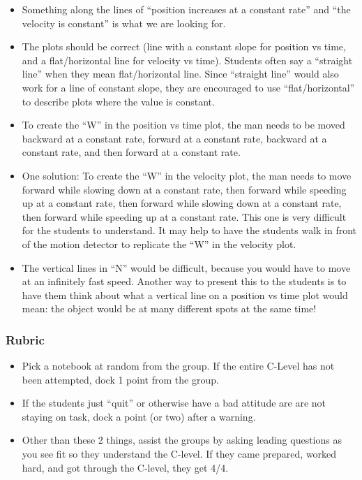 \documentclass[fleqn,letterpaper]{article}
\begin{document}
\begin{itemize}
 \item{Something along the lines of ``position increases at a constant rate'' and ``the velocity is constant'' is what we are looking for.}
 \item{The plots should be correct (line with a constant slope for position vs time, and a flat/horizontal line for velocity vs time).  Students often say a ``straight line'' when they mean flat/horizontal line.  Since ``straight line'' would also work for a line of constant slope, they are encouraged to use ``flat/horizontal'' to describe plots where the value is constant.}
 \item{To create the ``W'' in the position vs time plot, the man needs to be moved backward at a constant rate, forward at a constant rate, backward at a constant rate, and then forward at a constant rate.}
 \item{One solution:  To create the ``W'' in the velocity plot, the man needs to move forward while slowing down at a constant rate, then forward while speeding up at a constant rate, then forward while slowing down at a constant rate, then forward while speeding up at a constant rate.  This one is very difficult for the students to understand.  It may help to have the students walk in front of the motion detector to replicate the ``W'' in the velocity plot.}
 \item{The vertical lines in ``N'' would be difficult, because you would have to move at an infinitely fast speed.  Another way to present this to the students is to have them think about what a vertical line on a position vs time plot would mean: the object would be at many different spots at the same time!}
\end{itemize}

\subsubsection*{Rubric}

\begin{itemize}
 \item{Pick a notebook at random from the group.  If the entire C-Level has not been attempted, dock 1 point from the group.}
 \item{If the students just ``quit'' or otherwise have a bad attitude are are not staying on task, dock a point (or two) after a warning.}
 \item{Other than these 2 things, assist the groups by asking leading questions as you see fit so they understand the C-level.  If they came prepared, worked hard, and got through the C-level, they get 4/4.}
\end{itemize}
\end{document}
